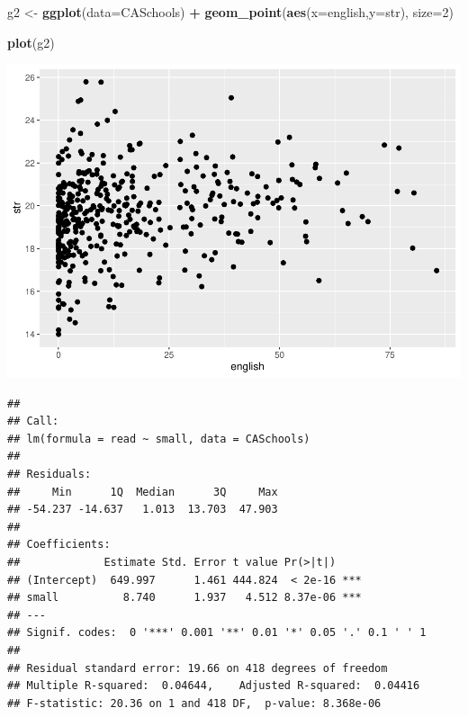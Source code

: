 \documentclass[
]{book}
\newenvironment{Shaded}{\begin{snugshade}}{\end{snugshade}}
\newcommand{\DataTypeTok}[1]{\textcolor[rgb]{0.13,0.29,0.53}{#1}}
\newcommand{\DecValTok}[1]{\textcolor[rgb]{0.00,0.00,0.81}{#1}}
\newcommand{\KeywordTok}[1]{\textcolor[rgb]{0.13,0.29,0.53}{\textbf{#1}}}
\newcommand{\NormalTok}[1]{#1}
\newcommand{\OperatorTok}[1]{\textcolor[rgb]{0.81,0.36,0.00}{\textbf{#1}}}
\newcommand{\StringTok}[1]{\textcolor[rgb]{0.31,0.60,0.02}{#1}}
\begin{document}
\begin{Shaded}
\begin{Highlighting}[]
\NormalTok{g2 <-}\StringTok{ }\KeywordTok{ggplot}\NormalTok{(}\DataTypeTok{data=}\NormalTok{CASchools) }\OperatorTok{+}\StringTok{ }
\StringTok{  }\KeywordTok{geom_point}\NormalTok{(}\KeywordTok{aes}\NormalTok{(}\DataTypeTok{x=}\NormalTok{english,}\DataTypeTok{y=}\NormalTok{str),   }\DataTypeTok{size=}\DecValTok{2}\NormalTok{) }

\KeywordTok{plot}\NormalTok{(g2)}
\end{Highlighting}
\end{Shaded}

\includegraphics{Metrics_files/figure-latex/unnamed-chunk-22-3.pdf}

\begin{Shaded}
\end{Shaded}

\begin{verbatim}
## 
## Call:
## lm(formula = read ~ small, data = CASchools)
## 
## Residuals:
##     Min      1Q  Median      3Q     Max 
## -54.237 -14.637   1.013  13.703  47.903 
## 
## Coefficients:
##             Estimate Std. Error t value Pr(>|t|)    
## (Intercept)  649.997      1.461 444.824  < 2e-16 ***
## small          8.740      1.937   4.512 8.37e-06 ***
## ---
## Signif. codes:  0 '***' 0.001 '**' 0.01 '*' 0.05 '.' 0.1 ' ' 1
## 
## Residual standard error: 19.66 on 418 degrees of freedom
## Multiple R-squared:  0.04644,    Adjusted R-squared:  0.04416 
## F-statistic: 20.36 on 1 and 418 DF,  p-value: 8.368e-06
\end{verbatim}
\end{document}
